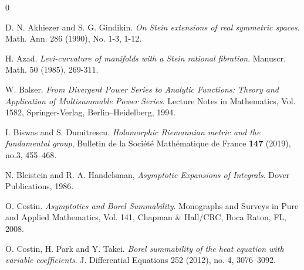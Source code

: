 \documentclass[11pt]{amsart}
\theoremstyle{plain}
\theoremstyle{definition}
\begin{document}
\bigskip



\begin{thebibliography}{0}


 D. N. Akhiezer and S. G. Gindikin.
\textit{On Stein extensions of real symmetric spaces}.
Math. Ann. 286 (1990), No. 1-3, 1-12.


 H. Azad.
\textit{Levi-curvature of manifolds with a Stein rational fibration}.
Manuscr. Math. 50 (1985), 269-311.


W. Balser.
\textit{From Divergent Power Series to Analytic Functions:
Theory and Application of Multisummable Power Series}.
Lecture Notes in Mathematics, Vol. 1582, Springer-Verlag, Berlin--Heidelberg, 1994.





 I. Biswas and S. Dumitrescu.
\textit{Holomorphic Riemannian metric and the fundamental group},
Bulletin de la Société Mathématique de France \textbf{147} (2019), no.3, 455--468.


 N. Bleistein and R. A. Handelsman,
\textit{Asymptotic Expansions of Integrals}.
Dover Publications, 1986.









O. Costin.
\textit{Asymptotics and Borel Summability}.
Monographs and Surveys in Pure and Applied Mathematics, Vol. 141,
Chapman \& Hall/CRC, Boca Raton, FL, 2008.


 O. Costin, H. Park and Y. Takei.
\textit{Borel summability of the heat equation with variable coefficients}.
J. Differential Equations 252 (2012), no. 4, 3076--3092.



\end{thebibliography}
\end{document}
